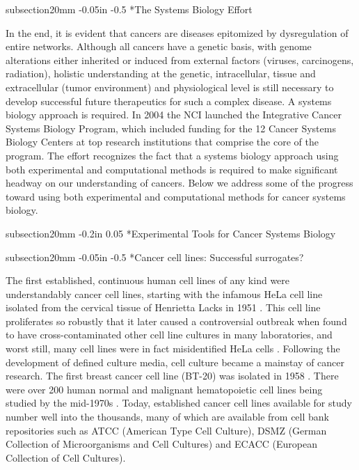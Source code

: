 \documentclass[12pt]{article}
\makeatletter
\renewcommand\subsection{\@startsection
	{subsection}{2}{0mm}
	{-0.05in}
	{-0.5\baselineskip}
	{\normalfont\normalsize\bfseries}}
\renewcommand\section{\@startsection
	{subsection}{2}{0mm}
	{-0.2in}
	{0.05\baselineskip}
	{\normalfont\large\bfseries}}
\makeatother
\begin{document}
\subsection*{The Systems Biology Effort} 

In the end, it is evident that cancers are diseases epitomized by dysregulation of entire networks. Although all cancers have a genetic basis, with genome alterations either inherited or induced from external factors (viruses, carcinogens, radiation), holistic understanding at the genetic, intracellular, tissue and extracellular (tumor environment) and physiological level is still necessary to develop successful future therapeutics for such a complex disease. A systems biology approach is required. In 2004 the NCI launched the Integrative Cancer Systems Biology Program, which included funding for the 12 Cancer Systems Biology Centers at top research institutions that comprise the core of the program. The effort recognizes the fact that a systems biology approach using both experimental and computational methods is required to make significant headway on our understanding of cancers. Below we address some of the progress toward using both experimental and computational methods for cancer systems biology.

\section*{Experimental Tools for Cancer Systems Biology}

\subsection*{Cancer cell lines: Successful surrogates?}

The first established, continuous human cell lines of any kind were understandably cancer cell lines, starting with the infamous HeLa cell line isolated from the cervical tissue of Henrietta Lacks in 1951 \cite{Masters2002,Lucey2009}. This cell line proliferates so robustly that it later caused a controversial outbreak when found to have cross-contaminated other cell line cultures in many laboratories, and worst still, many cell lines were in fact misidentified HeLa cells \cite{Masters2002,Lucey2009}. Following the development of defined culture media, cell culture became a mainstay of cancer research. The first breast cancer cell line (BT-20) was isolated in 1958 \cite{Holliday2011,LASFARGUES1958}. There were over 200 human normal and malignant hematopoietic cell lines being studied by the mid-1970s \cite{Nilsson1975,Koeffler1980}. Today, established cancer cell lines available for study number well into the thousands, many of which are available from cell bank repositories such as ATCC (American Type Cell Culture), DSMZ (German Collection of Microorganisms and Cell Cultures) and ECACC (European Collection of Cell Cultures).
\end{document}

